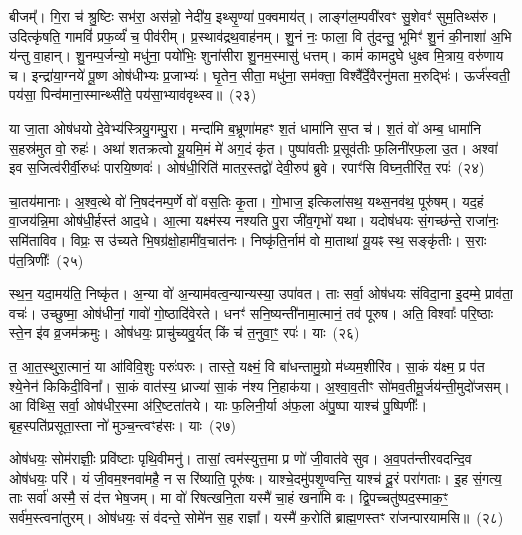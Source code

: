 बीजम्᳚। गि॒रा च॑ श्रु॒ष्टिः सभ॑रा॒ अस॑न्नो॒ नेदी॑य॒ इथ्सृ॒ण्या॑ प॒क्वमाय॑त्। लाङ्ग॑ल॒म्पवी॑रवꣳ सु॒शेवꣳ॑ सुम॒तिथ्स॑रु। उदित्कृ॑षति॒ गामविं॑ प्रफ॒र्व्यं॑ च॒ पीव॑रीम्। प्र॒स्थाव॑द्रथ॒वाह॑नम्। शु॒नं नः॒ फाला॒ वि तु॑दन्तु॒ भूमिꣳ॑ शु॒नं की॒नाशा॑ अ॒भि य॑न्तु वा॒हान्। शु॒नम्प॒र्जन्यो॒ मधु॑ना॒ पयो॑भिः॒ शुना॑सीरा शु॒नम॒स्मासु॑ धत्तम्। कामं॑ कामदुघे धुक्ष्व मि॒त्राय॒ वरु॑णाय च। इन्द्रा॑या॒ग्नये॑ पू॒ष्ण ओष॑धीभ्यः प्र॒जाभ्यः॑। घृ॒तेन॒ सीता॒ मधु॑ना॒ सम॑क्ता॒ विश्वै᳚र्दे॒वैरनु॑मता म॒रुद्भिः॑। ऊर्ज॑स्वती॒ पय॑सा॒ पिन्व॑माना॒स्मान्थ्सी॑ते॒ पय॑सा॒भ्याव॑वृथ्स्व॥~(२३)

{\anuvakamend[{समो॑कसौ विश्वरूपे वि॒दुर्निर्\mbox{}ऋ॑तिर॒भि च॑ष्ट इ॒ह मि॒त्राय॒ द्वाविꣳ॑शतिश्च}]}%

या जा॒ता ओष॑धयो दे॒वेभ्य॑स्त्रियु॒गम्पु॒रा। मन्दा॑मि ब॒भ्रूणा॑महꣳ श॒तं धामा॑नि स॒प्त च॑। श॒तं वो॑ अम्ब॒ धामा॑नि स॒हस्र॑मुत वो॒ रुहः॑। अथा॑ शतक्रत्वो यू॒यमि॒मं मे॑ अग॒दं कृ॑त। पुष्पा॑वतीः प्र॒सूव॑तीः फ॒लिनी॑रफ॒ला उ॒त। अश्वा॑ इव स॒जित्व॑रीर्वी॒रुधः॑ पारयि॒ष्णवः॑। ओष॑धी॒रिति॑ मातर॒स्तद्वो॑ देवी॒रुप॑ ब्रुवे। रपाꣳ॑सि विघ्न॒तीरि॑त॒ रपः॑~(२४)

चा॒तय॑मानाः। अ॒श्व॒त्थे वो॑ नि॒षद॑नम्प॒र्णे वो॑ वस॒तिः कृ॒ता। गो॒भाज॒ इत्किला॑सथ॒ यथ्स॒नव॑थ॒ पूरु॑षम्। यद॒हं वा॒जय॑न्नि॒मा ओष॑धी॒र्\mbox{}हस्त॑ आद॒धे। आ॒त्मा यक्ष्म॑स्य नश्यति पु॒रा जी॑व॒गृभो॑ यथा। यदोष॑धयः सं॒गच्छ॑न्ते॒ राजा॑नः॒ समि॑ताविव। विप्रः॒ स उ॑च्यते भि॒षग्र॑क्षो॒हामी॑व॒चात॑नः। निष्कृ॑ति॒र्नाम॑ वो मा॒ताथा॑ यू॒यꣴ स्थ॒ सङ्कृ॑तीः। स॒राः प॑त॒त्रिणीः᳚~(२५)

स्थ॒न॒ यदा॒मय॑ति॒ निष्कृ॑त। अ॒न्या वो॑ अ॒न्याम॑वत्व॒न्यान्यस्या॒ उपा॑वत। ताः सर्वा॒ ओष॑धयः संविदा॒ना इ॒दम्मे॒ प्राव॑ता॒ वचः॑। उच्छुष्मा॒ ओष॑धीनां॒ गावो॑ गो॒ष्ठादि॑वेरते। धनꣳ॑ सनि॒ष्यन्ती॑नामा॒त्मानं॒ तव॑ पूरुष। अति॒ विश्वाः᳚ परि॒ष्ठाः स्ते॒न इ॑व व्र॒जम॑क्रमुः। ओष॑धयः॒ प्राचु॑च्यवु॒र्यत् किं च॑ त॒नुवा॒ꣳ॒ रपः॑। याः~(२६)

त॒ आ॒त॒स्थुरा॒त्मानं॒ या आ॑विवि॒शुः परुः॑परुः। तास्ते॒ यक्ष्मं॒ वि बा॑धन्तामु॒ग्रो म॑ध्यम॒शीरि॑व। सा॒कं य॑क्ष्म॒ प्र प॑त श्ये॒नेन॑ किकिदी॒विना᳚। सा॒कं वात॑स्य॒ ध्राज्या॑ सा॒कं न॑श्य नि॒हाक॑या। अ॒श्वा॒व॒तीꣳ सो॑मव॒तीमू॒र्जय॑न्ती॒\-मुदो॑जसम्। आ वि॑थ्सि॒ सर्वा॒ ओष॑धीर॒स्मा अ॑रि॒ष्टता॑तये। याः फ॒लिनी॒र्या अ॑फ॒ला अ॑पु॒ष्पा याश्च॑ पु॒ष्पिणीः᳚। बृह॒स्पति॑प्रसूता॒स्ता नो॑ मुञ्च॒न्त्वꣳह॑सः। याः~(२७)

ओष॑धयः॒ सोम॑राज्ञीः॒ प्रवि॑ष्टाः पृथि॒वीमनु॑। तासां॒ त्वम॑स्युत्त॒मा प्र णो॑ जी॒वात॑वे सुव। अ॒व॒पत॑न्तीरवदन्दि॒व ओष॑धयः॒ परि॑। यं जी॒वम॒श्नवा॑महै॒ न स रि॑ष्याति॒ पूरु॑षः। याश्चे॒दमु॑पशृ॒ण्वन्ति॒ याश्च॑ दू॒रं परा॑गताः। इ॒ह सं॒गत्य॒ ताः सर्वा॑ अस्मै॒ सं द॑त्त भेष॒जम्। मा वो॑ रिषत्खनि॒ता यस्मै॑ चा॒हं खना॑मि वः। द्वि॒पच्चतु॑ष्पद॒स्माक॒ꣳ॒ सर्व॑म॒स्त्वना॑तुरम्। ओष॑धयः॒ सं व॑दन्ते॒ सोमे॑न स॒ह राज्ञा᳚। यस्मै॑ क॒रोति॑ ब्राह्म॒णस्तꣳ रा॑जन्पारयामसि॥~(२८)


